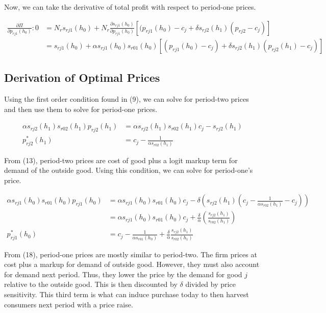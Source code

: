 Now, we can take the derivative of total profit with respect to period-one prices.

\begin{align}
  \frac{\partial\Pi}{\partial p_{rj1}(h_0)}: 0 &= N_rs_{rj1}(h_0) +
  N_r\frac{\partial s_{rj1}(h_0)}{\partial p_{rj1}(h_0)}[(p_{rj1}(h_0) - c_j +
  \delta s_{rj2}(h_1)(p_{rj2} - c_j)] \\
  &= s_{rj1}(h_0) + \alpha s_{rj1}(h_0)s_{r01}(h_0)[(p_{rj1}(h_0) - c_j) + \delta
  s_{rj2}(h_1)(p_{rj2}(h_1) - c_j)]
\end{align}

\subsection{Derivation of Optimal Prices}
\label{subsec:price-derivation}

Using the first order condition found in (9), we can solve for period-two prices
and then use them to solve for period-one prices.

\begin{align}
  \alpha s_{rj2}(h_1)s_{r02}(h_1)p_{rj2}(h_1) &= \alpha s_{rj2}(h_1)s_{r02}(h_1)c_j
  - s_{rj2}(h_1) \\
  p_{rj2}^*(h_1) &= c_j - \frac{1}{\alpha s_{r02}(h_1)}
\end{align}

From (13), period-two prices are cost of good plus a logit markup term for
demand of the outside good. Using this condition, we can solve for period-one's
price.

\begin{align}
  \alpha s_{rj1}(h_0)s_{r01}(h_0)p_{rj1}(h_0) &= \alpha
  s_{rj1}(h_0)s_{r01}(h_0)c_j - \delta(s_{rj2}(h_1)(c_j - \frac{1}{\alpha
  s_{r02}(h_1)} - c_j)) \\
  &= \alpha
  s_{rj1}(h_0)s_{r01}(h_0)c_j +
  \frac{\delta}{\alpha}(\frac{s_{rj2}(h_1)}{s_{r02}(h_1)}) \\
  p_{rj1}^*(h_0) &= c_j - \frac{1}{\alpha s_{r01}(h_0)} +
  \frac{\delta}{\alpha}\frac{s_{rj2}(h_1)}{s_{r02}(h_1)}
\end{align}

From (18), period-one prices are mostly similar to period-two. The firm prices
at cost plus a markup for demand of outside good. However, they must also
account for demand next period. Thus, they lower the price by the demand for
good $j$ relative to the outside good. This is then discounted by $\delta$
divided by price sensitivity. This third term is what can induce purchase today
to then harvest consumers next period with a price raise.


